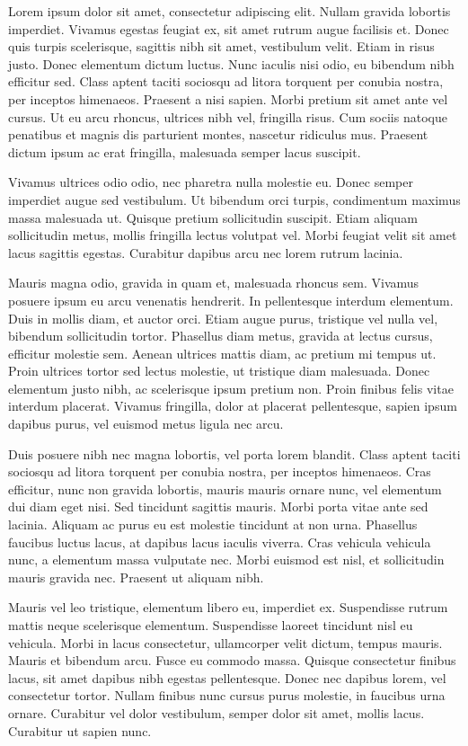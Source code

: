 \documentclass{article}
\begin{document}
\beginnumbering
\pstart


Lorem ipsum dolor sit amet, consectetur adipiscing elit. Nullam gravida lobortis imperdiet. Vivamus egestas feugiat ex, sit amet rutrum augue facilisis et. Donec quis turpis scelerisque, sagittis nibh sit amet, vestibulum velit. Etiam in risus justo. Donec elementum dictum luctus. Nunc iaculis nisi odio, eu bibendum nibh efficitur sed. Class aptent taciti sociosqu ad litora torquent per conubia nostra, per inceptos himenaeos. Praesent a nisi sapien. Morbi pretium sit amet ante vel cursus. Ut eu arcu rhoncus, ultrices nibh vel, fringilla risus. Cum sociis natoque penatibus et magnis dis parturient montes, nascetur ridiculus mus. Praesent dictum ipsum ac erat fringilla, malesuada semper lacus suscipit.

Vivamus ultrices odio odio, nec pharetra nulla molestie eu. Donec semper imperdiet augue sed vestibulum. Ut bibendum orci turpis, condimentum maximus massa malesuada ut. Quisque pretium sollicitudin suscipit. Etiam aliquam sollicitudin metus, mollis fringilla lectus volutpat vel. Morbi feugiat velit sit amet lacus sagittis egestas. Curabitur dapibus arcu nec lorem rutrum lacinia.

Mauris magna odio, gravida in quam et, malesuada rhoncus sem. Vivamus posuere ipsum eu arcu venenatis hendrerit. In pellentesque interdum elementum. Duis in mollis diam, et auctor orci. Etiam augue purus, tristique vel nulla vel, bibendum sollicitudin tortor. Phasellus diam metus, gravida at lectus cursus, efficitur molestie sem. Aenean ultrices mattis diam, ac pretium mi tempus ut. Proin ultrices tortor sed lectus molestie, ut tristique diam malesuada. Donec elementum justo nibh, ac scelerisque ipsum pretium non. Proin finibus felis vitae interdum placerat. Vivamus fringilla, dolor at placerat pellentesque, sapien ipsum dapibus purus, vel euismod metus ligula nec arcu.

Duis posuere nibh nec magna lobortis, vel porta lorem blandit. Class aptent taciti sociosqu ad litora torquent per conubia nostra, per inceptos himenaeos. Cras efficitur, nunc non gravida lobortis, mauris mauris ornare nunc, vel elementum dui diam eget nisi. Sed tincidunt sagittis mauris. Morbi porta vitae ante sed lacinia. Aliquam ac purus eu est molestie tincidunt at non urna. Phasellus faucibus luctus lacus, at dapibus lacus iaculis viverra. Cras vehicula vehicula nunc, a elementum massa vulputate nec. Morbi euismod est nisl, et sollicitudin mauris gravida nec. Praesent ut aliquam nibh.

Mauris vel leo tristique, elementum libero eu, imperdiet ex. Suspendisse rutrum mattis neque scelerisque elementum. Suspendisse laoreet tincidunt nisl eu vehicula. Morbi in lacus consectetur, ullamcorper velit dictum, tempus mauris. Mauris et bibendum arcu. Fusce eu commodo massa. Quisque consectetur finibus lacus, sit amet dapibus nibh egestas pellentesque. Donec nec dapibus lorem, vel consectetur tortor. Nullam finibus nunc cursus purus molestie, in faucibus urna ornare. Curabitur vel dolor vestibulum, semper dolor sit amet, mollis lacus. Curabitur ut sapien nunc.
\end{document}
